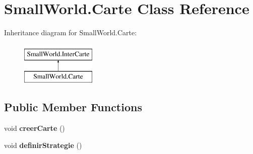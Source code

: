 \hypertarget{class_small_world_1_1_carte}{\section{Small\-World.\-Carte Class Reference}
\label{class_small_world_1_1_carte}
}
Inheritance diagram for Small\-World.\-Carte\-:\begin{figure}[H]
\begin{center}
\leavevmode
\includegraphics[height=2.000000cm]{class_small_world_1_1_carte}
\end{center}
\end{figure}
\subsection*{Public Member Functions}
\begin{DoxyCompactItemize}
\item 
\hypertarget{class_small_world_1_1_carte_adc3b166c073d261f7d4e4331ca2b4645}{void {\bfseries creer\-Carte} ()}\label{class_small_world_1_1_carte_adc3b166c073d261f7d4e4331ca2b4645}

\item 
\hypertarget{class_small_world_1_1_carte_ab39253ad9529d5641a0905bc1a66fd21}{void {\bfseries definir\-Strategie} ()}\label{class_small_world_1_1_carte_ab39253ad9529d5641a0905bc1a66fd21}

\end{DoxyCompactItemize}
